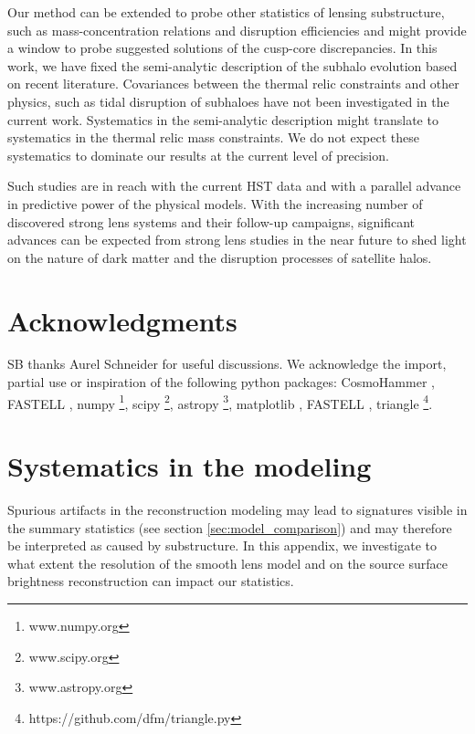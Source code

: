 \documentclass[a4paper,11pt]{article}
\begin{document}
Our method can be extended to probe other statistics of lensing substructure, such as mass-concentration relations and disruption efficiencies and might provide a window to probe suggested solutions of the cusp-core discrepancies. In this work, we have fixed the semi-analytic description of the subhalo evolution based on recent literature. Covariances between the thermal relic constraints and other physics, such as tidal disruption of subhaloes have not been investigated in the current work. Systematics in the semi-analytic description might translate to systematics in the thermal relic mass constraints. We do not expect these systematics to dominate our results at the current level of precision.

Such studies are in reach with the current HST data and with a parallel advance in predictive power of the physical models. With the increasing number of discovered strong lens systems and their follow-up campaigns, significant advances can be expected from strong lens studies in the near future to shed light on the nature of dark matter and the disruption processes of satellite halos.


\section*{Acknowledgments}
SB thanks Aurel Schneider for useful discussions. We acknowledge the import, partial use or inspiration of the following python packages: CosmoHammer \citep[][]{Akeret:2013p8319}, FASTELL \citep[][]{Barkana:1998p5324}, numpy \footnote{www.numpy.org}, scipy \footnote{www.scipy.org}, astropy \footnote{www.astropy.org}, matplotlib \citep[][]{Hunter:2007p14386}, FASTELL \citep[][]{Barkana:1998p5324}, triangle \footnote{https://github.com/dfm/triangle.py}. 




{}

\appendix


\section{Systematics in the modeling} \label{app:systematics}
Spurious artifacts in the reconstruction modeling may lead to signatures visible in the summary statistics (see section \ref{sec:model_comparison}) and may therefore be interpreted as caused by substructure. In this appendix, we investigate to what extent the resolution of the smooth lens model and on the source surface brightness reconstruction can impact our statistics.
\end{document}
